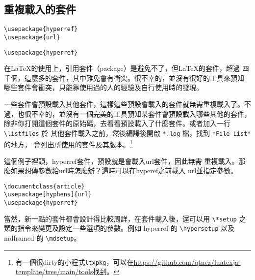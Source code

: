 \subsection{重複載入的套件}

\begin{Wrong}
\begin{verbatim}
\usepackage{hyperref}
\usepackage{url}
\end{verbatim}
\end{Wrong}

\begin{Right}
\begin{verbatim}
\usepackage{hyperref}
\end{verbatim}
\end{Right}

在\LaTeX 的使用上，引用套件（package）是避免不了，但\LaTeX 的套件，超過
四千個，這麼多的套件，其中難免會有衝突。很不幸的，並沒有很好的工具來預知
哪些套件會衝突，只能靠使用過的人的經驗及自行使用時的發現。

一些套件會預設載入其他套件，這樣這些預設會載入的套件就無需重複載入了。不
過，也很不幸的，並沒有一個完美的工具預知某套件會預設載入哪些其他的套件，
除非你打開這個套件的原始碼，去看看預設載入了什麼套件。或者加入一行 \verb|\listfiles| 於
其他套件載入之前，然後編譯後開啟 \verb|*.log| 檔，找到 \verb|*File List*| 的地方，
會列出所使用的套件及其版本。\footnote{有一個很dirty的小程式{\tt ltxpkg}，可以在\url{https://github.com/qtnez/luatexja-template/tree/main/tools}找到。}

這個例子裡頭，{\sf hyperref}套件，預設就是會載入{\sf url}套件，因此無需
重複載入。那麼如果想傳參數給{\sf url}時怎麼辦？這時可以在{\sf hyperef}之前載入
{\sf url}並指定參數。

\begin{Code}
\small
{}
\begin{verbatim}
\documentclass{article}
\usepackage[hyphens]{url}
\usepackage{hyperref}
\end{verbatim}
\end{Code}

當然，新一點的套件都會設計得比較周詳，在套件載入後，還可以用 \verb|\*setup| 之類的指令來變更及設定一些選項的參數。例如 {\sf hyperref} 的 \verb|\hypersetup| 以及 {\sf mdframed} 的 \verb|\mdsetup|。

\marginpar{\back}
